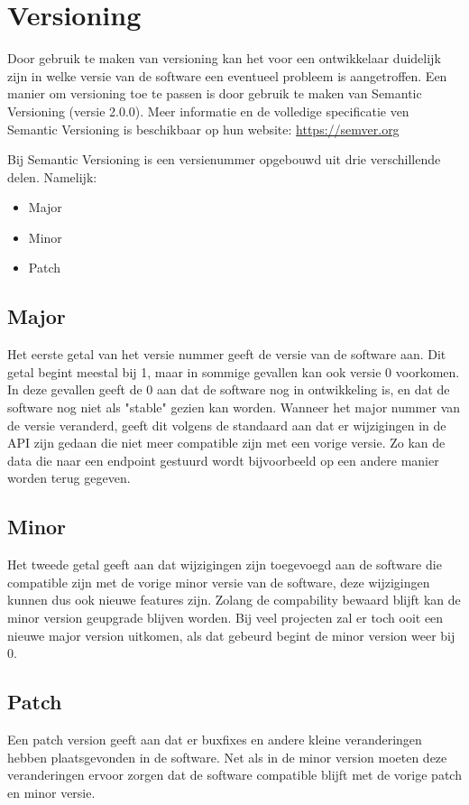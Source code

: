 \chapter{Versioning}
Door gebruik te maken van versioning kan het voor een ontwikkelaar duidelijk zijn in welke versie van de software een eventueel probleem is aangetroffen. 
Een manier om versioning toe te passen is door gebruik te maken van Semantic Versioning (versie 2.0.0).
Meer informatie en de volledige specificatie ven Semantic Versioning is beschikbaar op hun website: \url{https://semver.org}

Bij Semantic Versioning is een versienummer opgebouwd uit drie verschillende delen. Namelijk:
\begin{itemize}
	\item Major
	\item Minor
	\item Patch
\end{itemize}

\section{Major}
\label{sec:major}
Het eerste getal van het versie nummer geeft de versie van de software aan. Dit getal begint meestal bij 1, maar in sommige gevallen kan ook versie 0 voorkomen. In deze gevallen geeft de 0 aan dat de software nog in ontwikkeling is, en dat de software nog niet als "stable" gezien kan worden.
Wanneer het major nummer van de versie veranderd, geeft dit volgens de standaard aan dat er wijzigingen in de API zijn gedaan die niet meer compatible zijn met een vorige versie. Zo kan de data die naar een endpoint gestuurd wordt bijvoorbeeld op een andere manier worden terug gegeven.

\section{Minor}
Het tweede getal geeft aan dat wijzigingen zijn toegevoegd aan de software die compatible zijn met de vorige minor versie van de software, deze wijzigingen kunnen dus ook nieuwe features zijn.
Zolang de compability bewaard blijft kan de minor version geupgrade blijven worden.
Bij veel projecten zal er toch ooit een nieuwe major version uitkomen, als dat gebeurd begint de minor version weer bij 0.

\section{Patch}
Een patch version geeft aan dat er buxfixes en andere kleine veranderingen hebben plaatsgevonden in de software.
Net als in de minor version moeten deze veranderingen ervoor zorgen dat de software compatible blijft met de vorige patch en minor versie.

